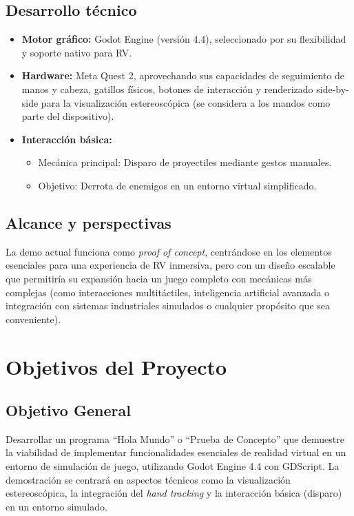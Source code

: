 \documentclass[journal,article,accept,pdftex,moreauthors]{Definitions/mdpi}
\begin{document}
\subsection*{Desarrollo técnico}
\begin{itemize}
    \item \textbf{Motor gráfico:} Godot Engine (versión 4.4), seleccionado por su flexibilidad y soporte nativo para RV.
    \item \textbf{Hardware:} Meta Quest 2, aprovechando sus capacidades de seguimiento de manos y cabeza, gatillos físicos, botones de interacción y renderizado side-by-side para la visualización estereoscópica (se considera a los mandos como parte del dispositivo).
    \item \textbf{Interacción básica:}
    \begin{itemize}
        \item Mecánica principal: Disparo de proyectiles mediante gestos manuales.
        \item Objetivo: Derrota de enemigos en un entorno virtual simplificado.
    \end{itemize}
\end{itemize}

\subsection*{Alcance y perspectivas}
La demo actual funciona como \textit{proof of concept}, centrándose en los elementos esenciales para una experiencia de RV inmersiva, pero con un diseño escalable que permitiría su expansión hacia un juego completo con mecánicas más complejas (como interacciones multitáctiles, inteligencia artificial avanzada o integración con sistemas industriales simulados o cualquier propósito que sea conveniente).

\section{Objetivos del Proyecto}

\subsection{Objetivo General}
Desarrollar un programa ``Hola Mundo'' o ``Prueba de Concepto'' que demuestre la viabilidad de implementar funcionalidades esenciales de realidad virtual en un entorno de simulación de juego, utilizando Godot Engine 4.4 con GDScript. La demostración se centrará en aspectos técnicos como la visualización estereoscópica, la integración del \textit{hand tracking} y la interacción básica (disparo) en un entorno simulado.
\end{document}
